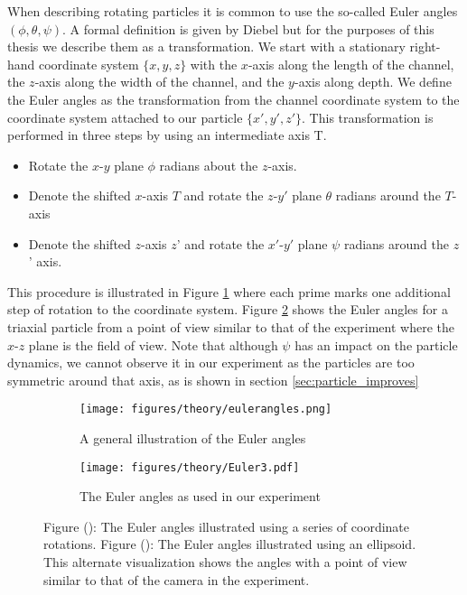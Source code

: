 When describing rotating particles it is common to use the so-called Euler angles $(\phi, \theta, \psi)$. A formal definition is given by Diebel \cite{Euler} but for the purposes of this thesis we describe them as a transformation. We start with a stationary right-hand coordinate system $\{x,y,z\}$ with the $x$-axis along the length of the channel, the $z$-axis along the width of the channel, and the $y$-axis along depth. We define the Euler angles as the transformation from the channel coordinate system to the coordinate system attached to our particle $\{x',y',z'\}$. This transformation is performed in three steps by using an intermediate axis T.

\begin{itemize}
\item Rotate the $x$-$y$ plane $\phi$ radians about the $z$-axis. 
\item Denote the shifted $x$-axis $T$ and rotate the $z$-$y'$ plane $\theta$ radians around the $T$-axis
\item Denote the shifted $z$-axis $z$' and rotate the $x'$-$y'$ plane $\psi$ radians around the $z$' axis.
\end{itemize}

This procedure is illustrated in Figure \ref{fig:eulerangles} where each prime marks one additional step of rotation to the coordinate system. Figure \ref{fig:eulerparticle} shows the Euler angles for a triaxial particle from a point of view similar to that of the experiment where the $x$-$z$ plane is the field of view. Note that although $\psi$ has an impact on the particle dynamics, we cannot observe it in our experiment as the particles are too symmetric around that axis, as is shown in section \ref{sec:particle_improves}


\begin{figure}[H]
\centering
\begin{subfigure}[b]{0.45\textwidth}
\texttt{[image: figures/theory/eulerangles.png]}
\caption{A general illustration of the Euler angles}
\label{fig:eulerangles}
\end{subfigure}
\begin{subfigure}[b]{0.45\textwidth}
\texttt{[image: figures/theory/Euler3.pdf]}
\caption{The Euler angles as used in our experiment}
\label{fig:eulerparticle}
\end{subfigure}
\caption{Figure (): The Euler angles illustrated using a series of coordinate rotations. 
Figure (): The Euler angles illustrated using an ellipsoid. This alternate visualization shows the angles with a point of view similar to that of the camera in the experiment. }\label{fig:eulerplots}
\end{figure}


